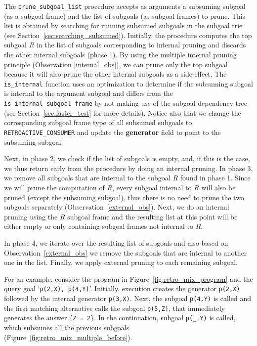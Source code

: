 The \texttt{prune\_subgoal\_list} procedure accepts as arguments a subsuming subgoal (as a subgoal frame) and the list of
subgoals (as subgoal frames) to prune. This list is obtained by searching for running subsumed subgoals in the subgoal trie
(see Section~\ref{sec:searching_subsumed}). Initially, the procedure computes the top subgoal $R$ in the
list of subgoals corresponding to internal pruning and discards the other internal subgoals (phase 1).
By using the multiple internal pruning principle
(Observation \ref{internal_obs}), we can prune only the top subgoal because it
will also prune the other internal subgoals as a side-effect. The \texttt{is\_internal} function uses an optimization
to determine if the subsuming subgoal is internal to the argument subgoal and differs from the
\texttt{is\_internal\_subgoal\_frame} by not making use of the subgoal dependency tree (see Section~\ref{sec:faster_test}
for more details). Notice also that we change the corresponding subgoal frame
type of all subsumed subgoals to \texttt{RETROACTIVE\_CONSUMER} and update the \textbf{generator} field to
point to the subsuming subgoal.

Next, in phase 2, we check if the list of subgoals is empty, and, if this is the case,
we thus return early from the procedure by doing an internal pruning.
In phase 3, we remove all subgoals that are internal to the subgoal $R$ found in phase 1.
Since we will prune the computation of $R$, every subgoal internal to $R$ will also be pruned
(except the subsuming subgoal), thus there is no need to prune the two subgoals separately
(Observation~\ref{external_obs}). Next, we do an internal pruning using the $R$ subgoal frame
and the resulting list at this point will be either empty or only containing subgoal
frames not internal to $R$.

In phase 4, we iterate over the resulting list of subgoals and also based on Observation~\ref{external_obs}
we remove the subgoals that are internal to another one in the list.
Finally, we apply external pruning to each remaining subgoal.

For an example, consider the program in Figure~\ref{fig:retro_mix_program} and the query goal
`\texttt{p(2,X),~p(4,Y)}'. Initially, execution creates the generator \texttt{p(2,X)} followed by the internal
generator \texttt{p(3,X)}. Next, the subgoal \texttt{p(4,Y)} is called and the first matching alternative calls the
subgoal \texttt{p(5,Z)}, that immediately generates the answer \texttt{\{Z~=~2\}}. In the continuation, subgoal
\texttt{p(\_,Y)} is called, which subsumes all the previous subgoals (Figure~\ref{fig:retro_mix_multiple_before}).

